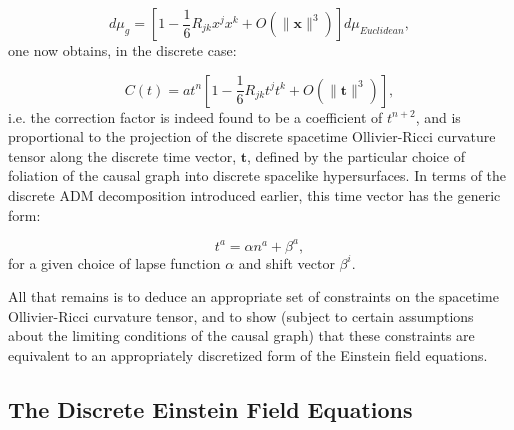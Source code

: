 \documentclass{article}
\begin{document}
\begin{equation}
d \mu_g = \left[ 1 - \frac{1}{6} R_{j k} x^j x^k + O \left( \lVert \mathbf{x} \rVert^3 \right) \right] d \mu_{Euclidean},
\end{equation}
one now obtains, in the discrete case:

\begin{equation}
C \left( t \right) = a t^n \left[ 1 - \frac{1}{6} R_{j k} t^j t^k + O \left( \lVert \mathbf{t} \rVert^3 \right) \right],
\end{equation}
i.e. the correction factor is indeed found to be a coefficient of ${t^{n + 2}}$, and is proportional to the projection of the discrete spacetime Ollivier-Ricci curvature tensor along the discrete time vector, ${\mathbf{t}}$, defined by the particular choice of foliation of the causal graph into discrete spacelike hypersurfaces. In terms of the discrete ADM decomposition introduced earlier, this time vector has the generic form:

\begin{equation}
t^a = \alpha n^a + \beta^a,
\end{equation}
for a given choice of lapse function ${\alpha}$ and shift vector ${\beta^i}$.

All that remains is to deduce an appropriate set of constraints on the spacetime Ollivier-Ricci curvature tensor, and to show (subject to certain assumptions about the limiting conditions of the causal graph) that these constraints are equivalent to an appropriately discretized form of the Einstein field equations.

\subsection{The Discrete Einstein Field Equations}
\label{sec:CurrentStatus7}
\end{document}
